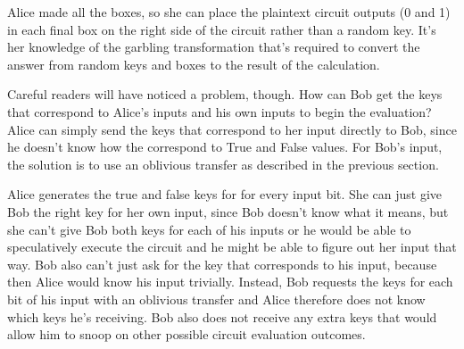 Alice made all the boxes, so she can place the plaintext circuit outputs (0 and 1) in each final box on the right side of the circuit rather than a random key. It's her knowledge of the garbling transformation that's required to convert the answer from random keys and boxes to the result of the calculation.

Careful readers will have noticed a problem, though. How can Bob get the keys that correspond to Alice's inputs and his own inputs to begin the evaluation? Alice can simply send the keys that correspond to her input directly to Bob, since he doesn't know how the correspond to True and False values. For Bob's input, the solution is to use an oblivious transfer as described in the previous section.

Alice generates the true and false keys for for every input bit. She can just give Bob the right key for her own input, since Bob doesn't know what it means, but she can't give Bob both keys for each of his inputs or he would be able to speculatively execute the circuit and he might be able to figure out her input that way. Bob also can't just ask for the key that corresponds to his input, because then Alice would know his input trivially. Instead, Bob requests the keys for each bit of his input with an oblivious transfer and Alice therefore does not know which keys he's receiving. Bob also does not receive any extra keys that would allow him to snoop on other possible circuit evaluation outcomes.

